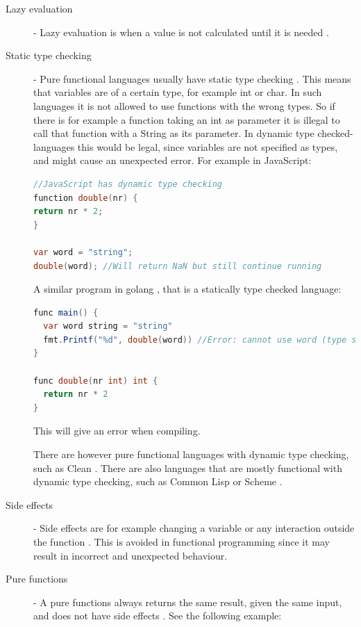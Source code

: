 \documentclass {article}
\begin{document}
\begin{description}
\item [Lazy evaluation] - Lazy evaluation is when a value is not calculated until it is needed \cite{fogus}.
\item [Static type checking] - Pure functional languages usually have static type checking \cite{gabmar}. This means that variables are of a certain type, for example int or char. In such languages it is not allowed to use functions with the wrong types. So if there is for example a function taking an int as parameter it is illegal to call that function with a String as its parameter. In dynamic type checked-languages this would be legal, since variables are not specified as types, and might cause an unexpected error. For example in JavaScript:

\begin{lstlisting}[language=Java]
//JavaScript has dynamic type checking
function double(nr) {
return nr * 2;
}

var word = "string";
double(word); //Will return NaN but still continue running
\end{lstlisting}

\item [ ] A similar program in golang \cite{golang}, that is a statically type checked language:

\begin{lstlisting}[language=Java]
func main() {
  var word string = "string"
  fmt.Printf("%d", double(word)) //Error: cannot use word (type string) as type int in argument to double
}

func double(nr int) int {
  return nr * 2
}
\end{lstlisting}

\item [ ] This will give an error when compiling.
\item[] There are however pure functional languages with dynamic type checking, such as Clean \cite{clean}. There are also languages that are mostly functional with dynamic type checking, such as Common Lisp \cite{commonLisp} or Scheme \cite{scheme} \cite{langTable}.
\item [Side effects] - Side effects are for example changing a variable or any interaction outside the function \cite{drboolean}. This is avoided in functional programming since it may result in incorrect and unexpected behaviour. 
\item [Pure functions] - A pure functions always returns the same result, given the same input, and does not have side effects \cite{drboolean}. See the following example: 


\end{description}
\end{document}
